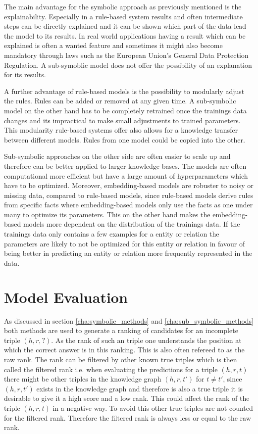 The main advantage for the symbolic approach as previously mentioned is the explainability. Especially in a rule-based system results and often intermediate steps can be directly explained and it can be shown which part of the data lead the model to its results. In real world applications having a result which can be explained is often a wanted feature and sometimes it might also become mandatory through laws such as the European Union’s General Data Protection Regulation. A sub-symoblic model does not offer the possibility of an explanation for its results. 

A further advantage of rule-based models is the possibility to modularly adjust the rules. Rules can be added or removed at any given time. A sub-symbolic model on the other hand has to be completely retrained once the trainings data changes and its impractical to make small adjustments to trained parameters. This modularity rule-based systems offer also allows for a knowledge transfer between different models. Rules from one model could be copied into the other. 

Sub-symbolic approaches on the other side are often easier to scale up and therefore can be better applied to larger knowledge bases. The models are often computational more efficient but have a large amount of hyperparameters which have to be optimized. Moreover, embedding-based models are robuster to noisy or missing data, compared to rule-based models, since rule-based models derive rules from specific facts where embedding-based models only use the facts as one under many to optimize its parameters. This on the other hand makes the embedding-based models more dependent on the distribution of the trainings data. If the trainings data only contains a few examples for a entity or relation the parameters are likely to not be optimized for this entity or relation in favour of being better in predicting an entity or relation more frequently represented in the data. \cite{ilkou_symbolic_2020}


\section{Model Evaluation}
\label{cha:evaluation}
As discussed in section \ref{cha:symbolic_methods} and \ref{cha:sub_symbolic_methods} both methods are used to generate a ranking of candidates for an incomplete triple $(h,r,?)$. As the rank of such an triple one understands the position at which the correct answer is in this ranking. This is also often refereed to as the raw rank. The rank can be filtered by other known true triples which is then called the filtered rank i.e. when evaluating the predictions for a triple $(h,r,t)$ there might be other triples in the knowledge graph $(h,r,t')$ for $t \neq t'$, since $(h,r,t')$ exists in the knowledge graph and therefore is also a true triple it is desirable to give it a high score and a low rank. This could affect the rank of the triple $(h,r,t)$ in a negative way. To avoid this other true triples are not counted for the filtered rank. Therefore the filtered rank is always less or equal to the raw rank. \cite{bordes_translating_2013}

